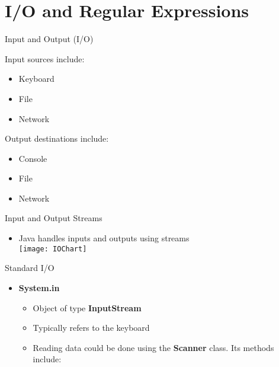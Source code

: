 %
%
%
\section{I/O and Regular Expressions}

\begin{itemize}
	\item Input and Output (I/O)
		\end{minipage}
		\begin{minipage}[t]{0.5\textwidth}
			\item Output destinations include:
			\begin{itemize}
				\item Console
				\item File
				\item Network
			\end{itemize}
		\end{minipage}
	\end{itemize}

	\item Input and Output Streams
	\begin{itemize}
		\item Java handles inputs and outputs using streams\\
		\texttt{[image: IOChart]}
	\end{itemize}

	\item Standard I/O
	\begin{itemize}
		\item \textbf{System.in}
		\begin{itemize}
			\item Object of type \textbf{InputStream}
			\item Typically refers to the keyboard
			\item Reading data could be done using the \textbf{Scanner} class. Its methods include:
		\end{itemize}


\end{itemize}
\end{itemize}
